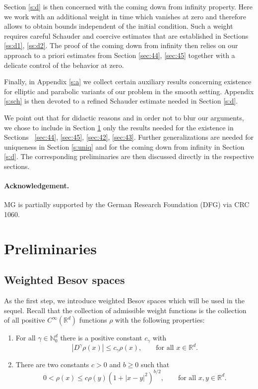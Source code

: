 \documentclass[a4paper,11pt]{article}
\renewcommand{\geq}{\geqslant}
\numberwithin{equation}{section}
\newcommand{\8}{\infty}
\begin{document}
Section \ref{s:d} is then concerned with the coming down from infinity property. Here we work with an additional weight in time which vanishes at zero and therefore allows to obtain bounds independent of the initial condition. Such a weight requires careful Schauder and coercive estimates that are established in Sections \ref{ss:d1}, \ref{ss:d2}. The proof of the coming down from infinity  then relies on our approach to a priori estimates from Section \ref{sec:44}, \ref{sec:45} together with a delicate control of the behavior at zero.

Finally, in Appendix \ref{s:a} we collect certain auxiliary results concerning existence for elliptic and parabolic variants of our problem in the smooth setting. Appendix \ref{s:sch} is then devoted to a refined Schauder estimate needed in Section \ref{s:d}.




We point out that for didactic reasons and in order not to blur our arguments, we chose to include in  Section \ref{s:prel}  only the results needed for the existence in Sections ~\ref{sec:44}, \ref{sec:45}, \ref{sec:42}, \ref{sec:43}. Further generalizations are  needed for uniqueness in Section \ref{s:uniq} and for the coming down from infinity in Section \ref{s:d}. The corresponding preliminaries are then discussed directly in the respective sections.


\paragraph{Acknowledgement.} MG is partially supported by the German Research Foundation (DFG) via CRC 1060.
 



\section{Preliminaries}
\label{s:prel}

\subsection{Weighted Besov spaces}
\label{ssec:besov}


As the first step, we introduce weighted Besov spaces which will be used in the sequel. Recall that the collection of  admissible weight functions is the collection of all positive $C^\infty(\mathbb{R}^d)$ functions $\rho$ with the following properties:
\begin{enumerate}
\item For all $\gamma\in\mathbb{N}_0^d$ there is a positive constant $c_\gamma$ with
$$
|D^\gamma\rho(x)|\leqslant c_\gamma \rho(x),\qquad\text{for all }x\in\mathbb{R}^d.
$$
\item There are two constants $c>0$ and $b\geq 0$ such that
$$
0<\rho(x)\leqslant c\rho(y)(1+|x-y|^2)^{b/2},\qquad\text{for all }x,y\in\mathbb{R}^d.
$$
\end{enumerate}
\end{document}
